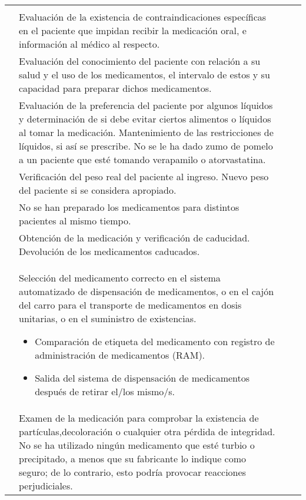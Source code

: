 \begin{landscape}
\begin{longtable}{N{0.15\textwidth}M{0.94\textwidth}|M{0.095\textwidth}M{0.22\textwidth}}
            & & \\  
            & Evaluación de la existencia de contraindicaciones específicas en el paciente que impidan recibir la medicación oral, e información al médico al respecto.
            & & \\  
            & Evaluación del conocimiento del paciente con relación a su salud y el uso de los medicamentos, el intervalo de estos y su capacidad para preparar dichos medicamentos.
            & & \\  
            & Evaluación de la preferencia del paciente por algunos líquidos  y determinación de si debe evitar ciertos alimentos o líquidos al tomar la medicación. Mantenimiento de las restricciones de líquidos, si así se prescribe. No se le ha dado zumo de pomelo a un paciente que esté tomando verapamilo o atorvastatina.
            & & \\  
            & Verificación del peso real del paciente al ingreso. Nuevo peso del paciente si se considera apropiado.
            & & \\  
            & No se han preparado los medicamentos para distintos pacientes al mismo tiempo.
            & & \\  
            & Obtención de la medicación y verificación de caducidad. Devolución de los medicamentos caducados.
            & & \\  
            & Selección del medicamento correcto en el sistema automatizado de dispensación de medicamentos, o en el cajón del carro para el transporte de medicamentos en dosis unitarias, o en el suministro de existencias.
            \begin{itemize}[topsep=0pt, partopsep=0pt,itemsep=0pt,parsep=0pt]
                \item Comparación de etiqueta del medicamento con registro de administración de medicamentos (RAM).
                \item Salida del sistema de dispensación de medicamentos después de retirar el/los mismo/s.
            \end{itemize}
            & & \\ 
            & Examen de la medicación para comprobar la existencia de partículas,decoloración o cualquier otra pérdida de integridad. No se ha utilizado ningún medicamento que esté turbio o precipitado, a menos que su fabricante lo indique como seguro; de lo contrario, esto podría provocar reacciones perjudiciales.
            & & \\  

\end{longtable}
\end{landscape}
